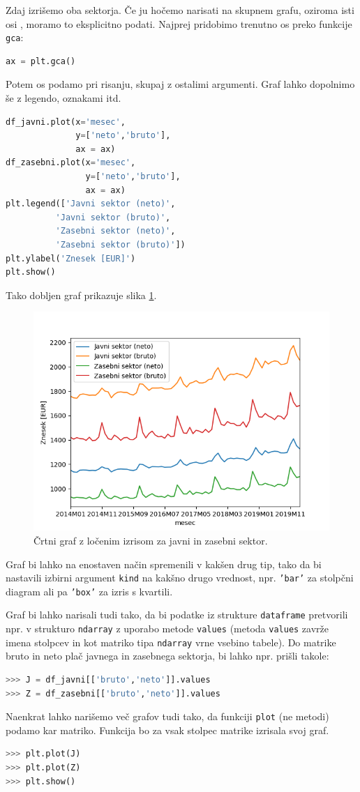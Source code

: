 Zdaj izrišemo oba sektorja. Če ju hočemo narisati na skupnem grafu, oziroma isti osi , moramo to eksplicitno podati. Najprej pridobimo trenutno os preko funkcije \texttt{gca}:
\begin{lstlisting}[language=python]
ax = plt.gca()
\end{lstlisting}
Potem os podamo pri risanju, skupaj z ostalimi argumenti. Graf lahko dopolnimo še z legendo, oznakami itd.
\begin{lstlisting}[language=python]
df_javni.plot(x='mesec',
              y=['neto','bruto'],
              ax = ax)
df_zasebni.plot(x='mesec',
                y=['neto','bruto'],
                ax = ax)
plt.legend(['Javni sektor (neto)',
          'Javni sektor (bruto)',
          'Zasebni sektor (neto)',
          'Zasebni sektor (bruto)'])
plt.ylabel('Znesek [EUR]')
plt.show()
\end{lstlisting}
Tako dobljen graf prikazuje slika \ref{img:plt_pandas2}.
\begin{figure}
    \includegraphics[width=\linewidth]{img/plt_pandas2.png}
    \caption{Črtni graf z ločenim izrisom za javni in zasebni sektor.}
    \label{img:plt_pandas2}
\end{figure}
Graf bi lahko na enostaven način spremenili v kakšen drug tip, tako da bi nastavili izbirni argument \texttt{kind} na kakšno drugo vrednost, npr. \texttt{'bar'} za stolpčni diagram ali pa \texttt{'box'} za izris s kvartili.

Graf bi lahko narisali tudi tako, da bi podatke iz strukture \texttt{dataframe} pretvorili npr. v strukturo \texttt{ndarray} z uporabo metode \texttt{values} (metoda \texttt{values} zavrže imena stolpcev in kot matriko tipa \texttt{ndarray} vrne vsebino tabele). Do matrike bruto in neto plač javnega in zasebnega sektorja, bi lahko npr. prišli takole:
\begin{lstlisting}[language=python]
>>> J = df_javni[['bruto','neto']].values
>>> Z = df_zasebni[['bruto','neto']].values
\end{lstlisting}
Naenkrat lahko narišemo več grafov tudi tako, da funkciji \texttt{plot} (ne metodi) podamo kar matriko. Funkcija bo za vsak stolpec matrike izrisala svoj graf.
\begin{lstlisting}[language=python]
>>> plt.plot(J)
>>> plt.plot(Z)
>>> plt.show()
\end{lstlisting}

